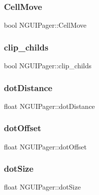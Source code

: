 \subsubsection{\texorpdfstring{Cell\+Move}{CellMove}}
{\footnotesize\ttfamily bool N\+G\+U\+I\+Pager\+::\+Cell\+Move}

\hypertarget{class_n_g_u_i_pager_a14f17d303935f354c8616874ed7e057d}{}\label{class_n_g_u_i_pager_a14f17d303935f354c8616874ed7e057d} 
\subsubsection{\texorpdfstring{clip\+\_\+childs}{clip\_childs}}
{\footnotesize\ttfamily bool N\+G\+U\+I\+Pager\+::clip\+\_\+childs}

\hypertarget{class_n_g_u_i_pager_a1a6ebb29f861318c885d837370e99f5a}{}\label{class_n_g_u_i_pager_a1a6ebb29f861318c885d837370e99f5a} 
\subsubsection{\texorpdfstring{dot\+Distance}{dotDistance}}
{\footnotesize\ttfamily float N\+G\+U\+I\+Pager\+::dot\+Distance}

\hypertarget{class_n_g_u_i_pager_ae981887577b67779a8068323862e22f4}{}\label{class_n_g_u_i_pager_ae981887577b67779a8068323862e22f4} 
\subsubsection{\texorpdfstring{dot\+Offset}{dotOffset}}
{\footnotesize\ttfamily float N\+G\+U\+I\+Pager\+::dot\+Offset}

\hypertarget{class_n_g_u_i_pager_ae186bfe43b9c15ca8735978c68b1d1dd}{}\label{class_n_g_u_i_pager_ae186bfe43b9c15ca8735978c68b1d1dd} 
\subsubsection{\texorpdfstring{dot\+Size}{dotSize}}
{\footnotesize\ttfamily float N\+G\+U\+I\+Pager\+::dot\+Size}

